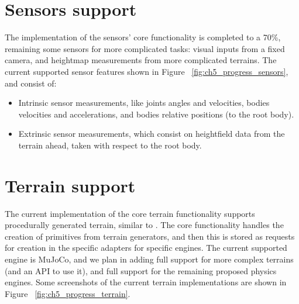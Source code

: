 \figProgressAgents

\section{Sensors support}

The implementation of the sensors' core functionality is completed to a 70\%,
remaining some sensors for more complicated tasks: visual inputs from a fixed camera,
and heightmap measurements from more complicated terrains. The current supported sensor
features shown in Figure ~\ref{fig:ch5_progress_sensors}, and consist of:

\begin{itemize}
    \item Intrinsic sensor measurements, like joints angles and velocities, bodies velocities
          and accelerations, and bodies relative positions (to the root body).
    \item Extrinsic sensor measurements, which consist on heightfield data from the terrain ahead,
          taken with respect to the root body.
\end{itemize}

\figProgressSensors

\section{Terrain support}

The current implementation of the core terrain functionality supports procedurally generated
terrain, similar to \cite{DeepmindEmergenceLocomotion}. The core functionality handles 
the creation of primitives from terrain generators, and then this is stored as 
requests for creation in the specific adapters for specific engines. The current 
supported engine is MuJoCo, and we plan in adding full support for more complex 
terrains (and an API to use it), and full support for the remaining proposed physics 
engines. Some screenshots of the current terrain implementations are shown
in Figure ~\ref{fig:ch5_progress_terrain}.

\figProgressTerrains

